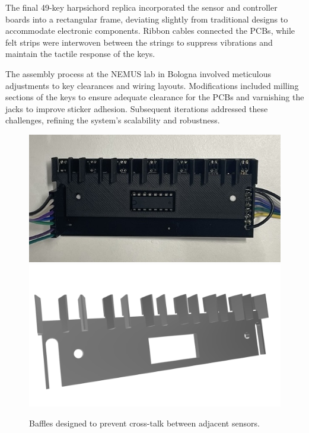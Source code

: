 The final 49-key harpsichord replica incorporated the sensor and controller boards into a rectangular frame, deviating slightly from traditional designs to accommodate electronic components. Ribbon cables connected the PCBs, while felt strips were interwoven between the strings to suppress vibrations and maintain the tactile response of the keys.

The assembly process at the NEMUS lab in Bologna involved meticulous adjustments to key clearances and wiring layouts. Modifications included milling sections of the keys to ensure adequate clearance for the PCBs and varnishing the jacks to improve sticker adhesion. Subsequent iterations addressed these challenges, refining the system’s scalability and robustness.




\begin{figure}
    \centering
    \includegraphics[width=\linewidth]{src/images/sensor-board-w-baffles.jpeg}
    \\
    \includegraphics[width=\linewidth]{src/images/baffles.png}
    \caption{Baffles designed to prevent cross-talk between adjacent sensors.}
    \label{fig:baffles}
\end{figure}

